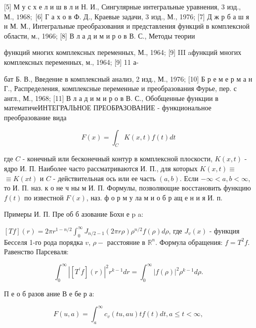 \documentclass[10pt]{article}
\begin{document}
[5] М у с х е л и ш в л и Н. И., Сингулярные интегральные уравнения, 3 изд., М., $1968 ;$ [6] Г а х о в Ф. Д., Краевые задачи, 3 изд., М., 1976; [7] Д ж р б а ш я н М. М., Интегральные преобразования и представления функций в комплексной области, м., 1966; [8] В л а д и м и р о в В. С., Методы теории

функций многих комплексных переменных, М., 1964; [9] III aфункций многих комплексных переменных, м., 1964; [9] 11 а-

бат Б. В., Введение в комплексный анализ, 2 изд., М., 1976; [10] Б р е м е р м а н Г., Распределения, комплексные переменные и преобразования Фурье, пер. с англ., М., 1968; [11] В л а д и м и р о в В. С., Обобщенные функции в математичеИНТЕГРАЛЬНОЕ ПРЕОБРАЗОВАНИЕ - функциональное преобразование вида



\[

F(x)=\int_{C} K(x, t) f(t) d t

\]



где $C$ - конечный или бесконечный контур в комплексной плоскости, $K(x, t)$ - ядро И. П. Наиболее часто рассматриваются И. П., для которых $K(x, t) \equiv$ $\equiv K(x t)$ и $C$ - действительная ось или ее часть $(a, b)$. Если $-\infty<a, b<\infty$, то И. П. наз. к о не ч ны м И. П. Формулы, позволяющие восстановить функцию $f(t)$ по известной $F(x)$, наз. ф о р м у ла м и о б р ащ е н и я И. п.



Примеры И. П. Пре об б азование Бохн е p a:



$[T f](r)=2 \pi r^{1-n / 2} \int_{0}^{\infty} J_{n / 2-1}(2 \pi r \rho) \rho^{n / 2} f(\rho) d \rho$, где $J_{v}(x)$ - функция Бесселя 1-го рода порядка $v$, $\rho-$ расстояние в $\mathbb{R}^{n}$. Формула обращения: $f=T^{2} f$. Равенство Парсеваля:



\[

\int_{0}^{\infty}\left|\left[T^{\prime} f\right](r)\right|^{2} r^{k-1} d r=\int_{0}^{\infty}|f(\rho)|^{2} \rho^{k-1} d \rho .

\]



П е о б разов ание В е бе р а:



\[

F(u, a)=\int_{a}^{\infty} c_{v}(t u, a u) t f(t) d t, a \leqslant t<\infty,

\]
\end{document}
